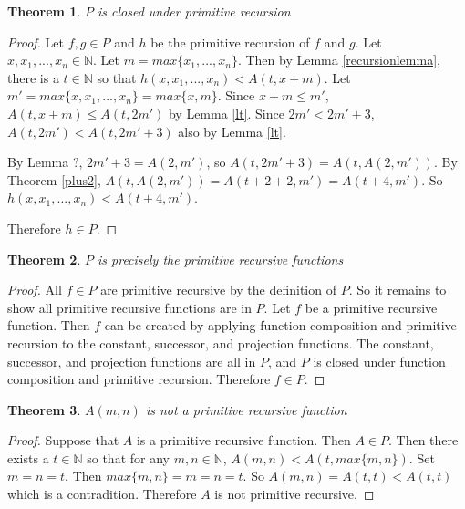 \documentclass[12pt, letterpaper]{article}
\newtheorem{theorem}{Theorem}
\theoremstyle{case}
\begin{document}
    \begin{theorem}
      $P$ is closed under primitive recursion
    \end{theorem}
    \begin{proof}
      Let $f, g \in P$ and $h$ be the primitive recursion of $f$ and $g$.
      Let $x, x_1, ..., x_n \in \mathbb{N}$.
      Let $m = max\{x_1, ..., x_n\}$.
      Then by Lemma \ref{recursionlemma}, there is a $t \in \mathbb{N}$ so that
      $h(x, x_1, ..., x_n) < A(t, x + m)$.
      Let $m' = max\{x, x_1, ..., x_n\} = max\{x, m\}$.
      Since $x + m \leq m'$, $A(t, x + m) \leq A(t, 2m')$ by Lemma \ref{lt}.
      Since $2m' < 2m' + 3$, $A(t, 2m') < A(t, 2m' + 3)$ also by Lemma \ref{lt}.

      By Lemma ?, $2m' + 3 = A(2, m')$, so $A(t, 2m' + 3) = A(t, A(2, m'))$.
      By Theorem \ref{plus2}, $A(t, A(2, m')) = A(t + 2 + 2, m') = A(t + 4, m')$.
      So $h(x, x_1, ..., x_n) < A(t + 4, m')$.

      Therefore $h \in P$.
    \end{proof}

    \begin{theorem}
      $P$ is precisely the primitive recursive functions
    \end{theorem}
    \begin{proof}
      All $f \in P$ are primitive recursive by the definition of $P$.
      So it remains to show all primitive recursive functions are in $P$.
      Let $f$ be a primitive recursive function.
      Then $f$ can be created by applying function composition and primitive recursion to the constant, successor, and
      projection functions. The constant, successor, and projection functions are all in $P$, and $P$ is closed under
      function composition and primitive recursion. Therefore $f \in P$.
    \end{proof}

    \begin{theorem}
      $A(m, n)$ is not a primitive recursive function
    \end{theorem}
    \begin{proof}
      Suppose that $A$ is a primitive recursive function. Then $A \in P$. Then there exists a $t \in \mathbb{N}$
      so that for any $m, n \in \mathbb{N}$, $A(m, n) < A(t, max\{m, n\})$.
      Set $m = n = t$. Then $max\{m, n\} = m = n = t$. So $A(m, n) = A(t, t) < A(t, t)$ which is a contradition.
      Therefore $A$ is not primitive recursive.
    \end{proof}
\end{document}
